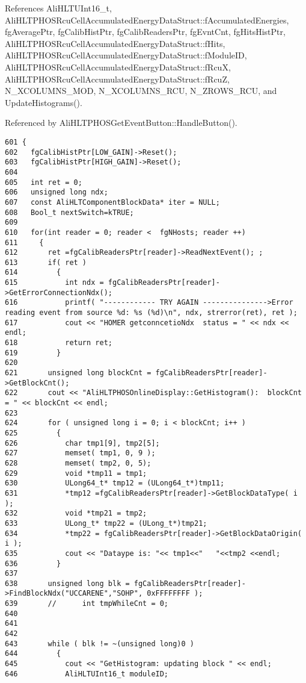 References Ali\-HLTUInt16\_\-t, Ali\-HLTPHOSRcu\-Cell\-Accumulated\-Energy\-Data\-Struct::f\-Accumulated\-Energies, fg\-Average\-Ptr, fg\-Calib\-Hist\-Ptr, fg\-Calib\-Readers\-Ptr, fg\-Evnt\-Cnt, fg\-Hits\-Hist\-Ptr, Ali\-HLTPHOSRcu\-Cell\-Accumulated\-Energy\-Data\-Struct::f\-Hits, Ali\-HLTPHOSRcu\-Cell\-Accumulated\-Energy\-Data\-Struct::f\-Module\-ID, Ali\-HLTPHOSRcu\-Cell\-Accumulated\-Energy\-Data\-Struct::f\-Rcu\-X, Ali\-HLTPHOSRcu\-Cell\-Accumulated\-Energy\-Data\-Struct::f\-Rcu\-Z, N\_\-XCOLUMNS\_\-MOD, N\_\-XCOLUMNS\_\-RCU, N\_\-ZROWS\_\-RCU, and Update\-Histograms().

Referenced by Ali\-HLTPHOSGet\-Event\-Button::Handle\-Button().

\footnotesize\begin{verbatim}601 {
602   fgCalibHistPtr[LOW_GAIN]->Reset(); 
603   fgCalibHistPtr[HIGH_GAIN]->Reset();
604  
605   int ret = 0;
606   unsigned long ndx;
607   const AliHLTComponentBlockData* iter = NULL;   
608   Bool_t nextSwitch=kTRUE; 
609 
610   for(int reader = 0; reader <  fgNHosts; reader ++)
611     {
612       ret =fgCalibReadersPtr[reader]->ReadNextEvent(); ;  
613       if( ret ) 
614         {
615           int ndx = fgCalibReadersPtr[reader]->GetErrorConnectionNdx();
616           printf( "------------ TRY AGAIN --------------->Error reading event from source %d: %s (%d)\n", ndx, strerror(ret), ret );
617           cout << "HOMER getconncetioNdx  status = " << ndx << endl;
618           return ret; 
619         }
620       
621       unsigned long blockCnt = fgCalibReadersPtr[reader]->GetBlockCnt();
622       cout << "AliHLTPHOSOnlineDisplay::GetHistogram():  blockCnt  = " << blockCnt << endl;
623 
624       for ( unsigned long i = 0; i < blockCnt; i++ ) 
625         {
626           char tmp1[9], tmp2[5];
627           memset( tmp1, 0, 9 );
628           memset( tmp2, 0, 5);
629           void *tmp11 = tmp1;
630           ULong64_t* tmp12 = (ULong64_t*)tmp11;
631           *tmp12 =fgCalibReadersPtr[reader]->GetBlockDataType( i );
632           void *tmp21 = tmp2;
633           ULong_t* tmp22 = (ULong_t*)tmp21;
634           *tmp22 = fgCalibReadersPtr[reader]->GetBlockDataOrigin( i );
635           cout << "Dataype is: "<< tmp1<<"   "<<tmp2 <<endl;
636         }
637       
638       unsigned long blk = fgCalibReadersPtr[reader]->FindBlockNdx("UCCARENE","SOHP", 0xFFFFFFFF );
639       //      int tmpWhileCnt = 0;
640   
641 
642 
643       while ( blk != ~(unsigned long)0 ) 
644         {
645           cout << "GetHistogram: updating block " << endl;
646           AliHLTUInt16_t moduleID;

\end{verbatim}
